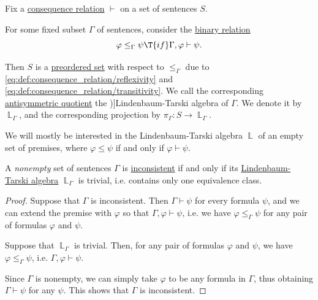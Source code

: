 \begin{definition}\label{def:lindenbaum_tarski_algebra}
  Fix a \hyperref[def:consequence_relation]{consequence relation} \( {\vdash} \) on a set of sentences \( S \).

  For some fixed subset \( \Gamma \) of sentences, consider the \hyperref[def:binary_relation]{binary relation}
  \begin{equation*}
    \varphi \leq_\Gamma \psi \T{if} \Gamma, \varphi \vdash \psi.
  \end{equation*}

  Then \( S \) is a \hyperref[def:preordered_set]{preordered set} with respect to \( \leq_\Gamma \) due to \eqref{eq:def:consequence_relation/reflexivity} and \eqref{eq:def:consequence_relation/transitivity}. We call the corresponding \hyperref[def:antisymmetric_quotient]{antisymmetric quotient} the \term[ru=алгебра Линденбаума-Тарского, en=Lindenbaum-Tarski algebra (\cite[def. 6.3.1]{CitkinMuravitsky2022ConsequenceRelations})]{Lindenbaum-Tarski algebra} of \( \Gamma \). We denote it by \( \BbbL_\Gamma \), and the corresponding projection by \( \pi_\Gamma: S \to \BbbL_\Gamma \).
\end{definition}
\begin{comments}
  \item We will mostly be interested in the Lindenbaum-Tarski algebra \( \BbbL \) of an empty set of premises, where \( \varphi \leq \psi \) if and only if \( \varphi \vdash \psi \).
\end{comments}

\begin{proposition}\label{thm:inconsistent_lindenbaum_tarski_algebra}
  A \emph{nonempty} set of sentences \( \Gamma \) is \hyperref[def:consistent_set_of_sentences]{inconsistent} if and only if its \hyperref[def:lindenbaum_tarski_algebra]{Lindenbaum-Tarski algebra} \( \BbbL_\Gamma \) is trivial, i.e. contains only one equivalence class.
\end{proposition}
\begin{proof}
  \SufficiencySubProof Suppose that \( \Gamma \) is inconsistent. Then \( \Gamma \vdash \psi \) for every formula \( \psi \), and we can extend the premise with \( \varphi \) so that \( \Gamma, \varphi \vdash \psi \), i.e. we have \( \varphi \leq_\Gamma \psi \) for any pair of formulas \( \varphi \) and \( \psi \).

  \NecessitySubProof Suppose that \( \BbbL_\Gamma \) is trivial. Then, for any pair of formulas \( \varphi \) and \( \psi \), we have \( \varphi \leq_\Gamma \psi \), i.e. \( \Gamma, \varphi \vdash \psi \).

  Since \( \Gamma \) is nonempty, we can simply take \( \varphi \) to be any formula in \( \Gamma \), thus obtaining \( \Gamma \vdash \psi \) for any \( \psi \). This shows that \( \Gamma \) is inconsistent.
\end{proof}

